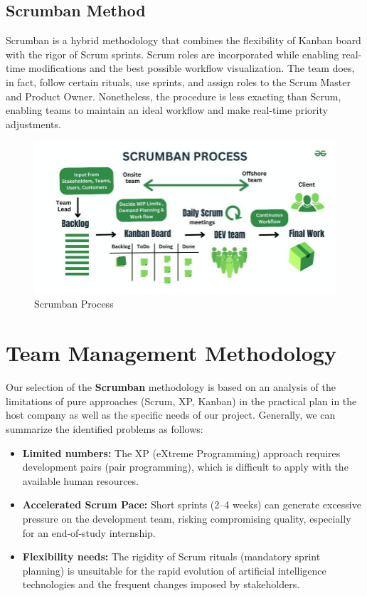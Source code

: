 \subsection{Scrumban Method}
Scrumban is a hybrid methodology that combines the flexibility of Kanban board with the rigor of Scrum sprints. Scrum roles are incorporated while enabling real-time modifications and the best possible workflow visualization. The team does, in fact, follow certain rituals, use sprints, and assign roles to the Scrum Master and Product Owner. Nonetheless, the procedure is less exacting than Scrum, enabling teams to maintain an ideal workflow and make real-time priority adjustments.

\begin{center}
\begin{figure}[H]
            \centering
            \includegraphics[scale=0.55]{images/scrumban.jpg}
            \caption{Scrumban Process }
            \label{fig:Scrumban_Process}
\end{figure}
\end{center}   


\section{Team Management Methodology}
Our selection of the \textbf{Scrumban} methodology is based on an analysis of the limitations of pure approaches (Scrum, XP, Kanban) in the practical plan in the host company as well as the specific needs of our project. Generally, we can summarize the identified problems as follows:
\begin{itemize}
    \item \textbf{Limited numbers:}
    The XP (eXtreme Programming) approach requires development pairs (pair programming), which is difficult to apply with the available human resources.
        
    \item \textbf{Accelerated Scrum Pace:}
    Short sprints (2–4 weeks) can generate excessive pressure on the development team, risking compromising quality, especially for an end-of-study internship.    
        
    \item \textbf{Flexibility needs:}
    The rigidity of Scrum rituals (mandatory sprint planning) is unsuitable for the rapid evolution of artificial intelligence technologies and the frequent changes imposed by stakeholders.
    \end{itemize}
    
